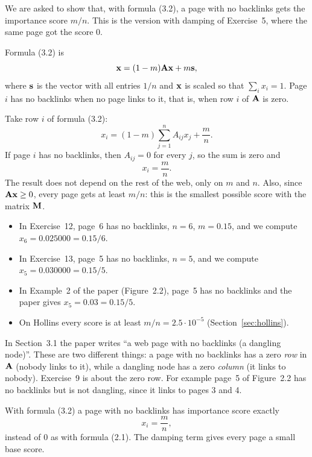

We are asked to show that, with formula (3.2), a page with no backlinks gets the importance score $m/n$.
This is the version with damping of Exercise~5, where the same page got the score $0$.


Formula (3.2) is
\[
  \mathbf{x} = (1-m)\mathbf{A}\mathbf{x} + m\mathbf{s} ,
\]
where $\mathbf{s}$ is the vector with all entries $1/n$ and $\mathbf{x}$ is scaled so that $\sum_i x_i = 1$.
Page $i$ has no backlinks when no page links to it, that is, when row $i$ of $\mathbf{A}$ is zero.


Take row $i$ of formula (3.2):
\[
  x_i = (1-m)\sum_{j=1}^n A_{ij}x_j + \frac{m}{n} .
\]
If page $i$ has no backlinks, then $A_{ij} = 0$ for every $j$, so the sum is zero and
\[
  x_i = \frac{m}{n} .
\]
The result does not depend on the rest of the web, only on $m$ and $n$.
Also, since $\mathbf{A}\mathbf{x} \ge 0$, every page gets at least $m/n$: this is the smallest possible score with the matrix $\mathbf{M}$.


\begin{itemize}
  \item In Exercise~12, page~6 has no backlinks, $n = 6$, $m = 0.15$, and we compute $x_6 = 0.025000 = 0.15/6$.
  \item In Exercise~13, page~5 has no backlinks, $n = 5$, and we compute $x_5 = 0.030000 = 0.15/5$.
  \item In Example~2 of the paper (Figure~2.2), page~5 has no backlinks and the paper gives $x_5 = 0.03 = 0.15/5$.
  \item On Hollins every score is at least $m/n = 2.5\cdot10^{-5}$ (Section~\ref{sec:hollins}).
\end{itemize}


In Section~3.1 the paper writes ``a web page with no backlinks (a dangling node)''.
These are two different things: a page with no backlinks has a zero \emph{row} in $\mathbf{A}$ (nobody links to it), while a dangling node has a zero \emph{column} (it links to nobody).
Exercise~9 is about the zero row.
For example page~5 of Figure~2.2 has no backlinks but is not dangling, since it links to pages 3 and 4.


With formula (3.2) a page with no backlinks has importance score exactly
\[
  x_i = \frac{m}{n} ,
\]
instead of $0$ as with formula (2.1). The damping term gives every page a small base score.
